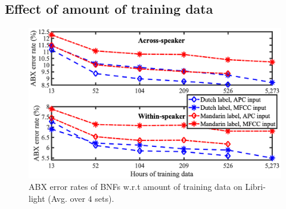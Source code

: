 \documentclass[a4paper]{article}
\begin{document}









\subsection{Effect of amount of training data}
\begin{figure}[!t]
    \centering
    \includegraphics[width=0.9\linewidth]{LaTeX/crsling_dnn_bnf_apc_input_vert_no_prefix_adt_apc_across_9.36_hori_no_hrs.png}
    \caption{ABX error rates of BNFs w.r.t amount of training data on Libri-light (Avg. over $4$ sets).}
    \label{fig:dnn_bnf_data_amount}
\end{figure}
\end{document}
